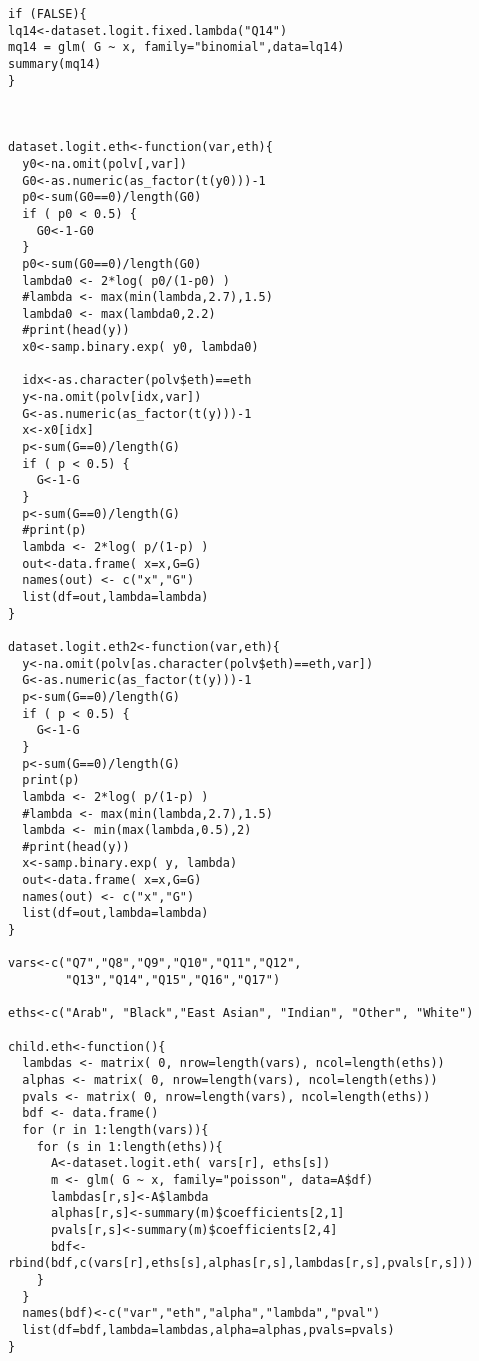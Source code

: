 \documentclass{amsart}
\begin{document}
\begin{verbatim}
if (FALSE){
lq14<-dataset.logit.fixed.lambda("Q14")
mq14 = glm( G ~ x, family="binomial",data=lq14)
summary(mq14)
}



dataset.logit.eth<-function(var,eth){
  y0<-na.omit(polv[,var])
  G0<-as.numeric(as_factor(t(y0)))-1
  p0<-sum(G0==0)/length(G0)
  if ( p0 < 0.5) {
    G0<-1-G0
  }
  p0<-sum(G0==0)/length(G0)
  lambda0 <- 2*log( p0/(1-p0) )
  #lambda <- max(min(lambda,2.7),1.5)
  lambda0 <- max(lambda0,2.2)
  #print(head(y))
  x0<-samp.binary.exp( y0, lambda0)
  
  idx<-as.character(polv$eth)==eth
  y<-na.omit(polv[idx,var])
  G<-as.numeric(as_factor(t(y)))-1
  x<-x0[idx]
  p<-sum(G==0)/length(G)
  if ( p < 0.5) {
    G<-1-G
  }
  p<-sum(G==0)/length(G)
  #print(p)
  lambda <- 2*log( p/(1-p) )
  out<-data.frame( x=x,G=G)
  names(out) <- c("x","G")
  list(df=out,lambda=lambda)
}

dataset.logit.eth2<-function(var,eth){
  y<-na.omit(polv[as.character(polv$eth)==eth,var])
  G<-as.numeric(as_factor(t(y)))-1
  p<-sum(G==0)/length(G)
  if ( p < 0.5) {
    G<-1-G
  }
  p<-sum(G==0)/length(G)
  print(p)
  lambda <- 2*log( p/(1-p) )
  #lambda <- max(min(lambda,2.7),1.5)
  lambda <- min(max(lambda,0.5),2)
  #print(head(y))
  x<-samp.binary.exp( y, lambda)
  out<-data.frame( x=x,G=G)
  names(out) <- c("x","G")
  list(df=out,lambda=lambda)
}

vars<-c("Q7","Q8","Q9","Q10","Q11","Q12",
        "Q13","Q14","Q15","Q16","Q17")

eths<-c("Arab", "Black","East Asian", "Indian", "Other", "White")

child.eth<-function(){
  lambdas <- matrix( 0, nrow=length(vars), ncol=length(eths))
  alphas <- matrix( 0, nrow=length(vars), ncol=length(eths))
  pvals <- matrix( 0, nrow=length(vars), ncol=length(eths))
  bdf <- data.frame()
  for (r in 1:length(vars)){
    for (s in 1:length(eths)){
      A<-dataset.logit.eth( vars[r], eths[s])
      m <- glm( G ~ x, family="poisson", data=A$df)
      lambdas[r,s]<-A$lambda
      alphas[r,s]<-summary(m)$coefficients[2,1]
      pvals[r,s]<-summary(m)$coefficients[2,4]
      bdf<-rbind(bdf,c(vars[r],eths[s],alphas[r,s],lambdas[r,s],pvals[r,s]))
    }
  } 
  names(bdf)<-c("var","eth","alpha","lambda","pval")
  list(df=bdf,lambda=lambdas,alpha=alphas,pvals=pvals)
}
\end{verbatim}
\end{document}
